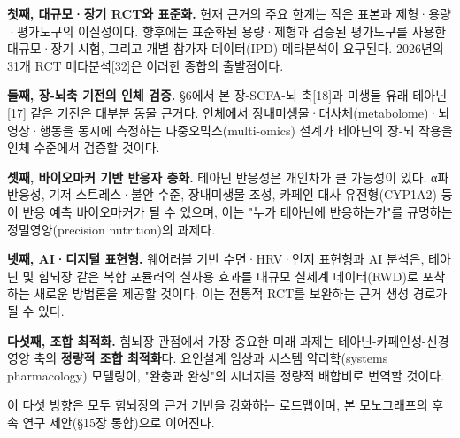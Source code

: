 \documentclass[11pt,oneside]{book}
\begin{document}
\textbf{첫째, 대규모·장기 RCT와 표준화.} 현재 근거의 주요 한계는 작은 표본과 제형·용량·평가도구의 이질성이다. 향후에는 표준화된 용량·제형과 검증된 평가도구를 사용한 대규모·장기 시험, 그리고 개별 참가자 데이터(IPD) 메타분석이 요구된다. 2026년의 31개 RCT 메타분석[32]은 이러한 종합의 출발점이다.

\textbf{둘째, 장-뇌축 기전의 인체 검증.} §6에서 본 장-SCFA-뇌 축[18]과 미생물 유래 테아닌[17] 같은 기전은 대부분 동물 근거다. 인체에서 장내미생물·대사체(metabolome)·뇌 영상·행동을 동시에 측정하는 다중오믹스(multi-omics) 설계가 테아닌의 장-뇌 작용을 인체 수준에서 검증할 것이다.

\textbf{셋째, 바이오마커 기반 반응자 층화.} 테아닌 반응성은 개인차가 클 가능성이 있다. α파 반응성, 기저 스트레스·불안 수준, 장내미생물 조성, 카페인 대사 유전형(CYP1A2) 등이 반응 예측 바이오마커가 될 수 있으며, 이는 "누가 테아닌에 반응하는가"를 규명하는 정밀영양(precision nutrition)의 과제다.

\textbf{넷째, AI·디지털 표현형.} 웨어러블 기반 수면·HRV·인지 표현형과 AI 분석은, 테아닌 및 힘뇌장 같은 복합 포뮬러의 실사용 효과를 대규모 실세계 데이터(RWD)로 포착하는 새로운 방법론을 제공할 것이다. 이는 전통적 RCT를 보완하는 근거 생성 경로가 될 수 있다.

\textbf{다섯째, 조합 최적화.} 힘뇌장 관점에서 가장 중요한 미래 과제는 테아닌-카페인성-신경영양 축의 \textbf{정량적 조합 최적화}다. 요인설계 임상과 시스템 약리학(systems pharmacology) 모델링이, "완충과 완성"의 시너지를 정량적 배합비로 번역할 것이다.

이 다섯 방향은 모두 힘뇌장의 근거 기반을 강화하는 로드맵이며, 본 모노그래프의 후속 연구 제안(§15장 통합)으로 이어진다.
\end{document}
